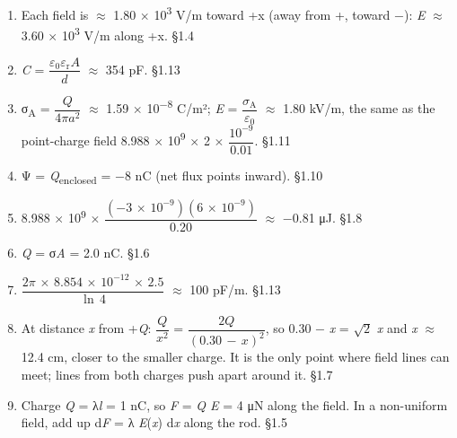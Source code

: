 \documentclass[11pt]{article}
\begin{document}
\begin{keepsection}
\begin{enumerate}
\item Each field is \ensuremath{\approx} 1.80 \ensuremath{\times} 10\textsuperscript{3} V/m toward +x (away from +, toward \ensuremath{-}): \textit{E} \ensuremath{\approx} 3.60 \ensuremath{\times} 10\textsuperscript{3} V/m along +x. \hfill{\small\color{FAUblue}§1.4}
\item \textit{C} = {\small\ensuremath{\dfrac{ε_{0}ε_{\mathrm{r}}{A}}{{d}}}} \ensuremath{\approx} 354 pF. \hfill{\small\color{FAUblue}§1.13}
\item σ\textsubscript{A} = {\small\ensuremath{\dfrac{{Q}}{4π{a}^{2}}}} \ensuremath{\approx} 1.59 \ensuremath{\times} 10\textsuperscript{\ensuremath{-}8} C/m²; \textit{E} = {\small\ensuremath{\dfrac{σ_{\mathrm{A}}}{ε_{0}}}} \ensuremath{\approx} 1.80 kV/m, the same as the point-charge field 8.988 \ensuremath{\times} 10\textsuperscript{9} \ensuremath{\times} 2 \ensuremath{\times} {\small\ensuremath{\dfrac{10^{-9}}{0.01}}}. \hfill{\small\color{FAUblue}§1.11}
\item Ψ = \textit{Q}\textsubscript{enclosed} = \ensuremath{-}8 nC (net flux points inward). \hfill{\small\color{FAUblue}§1.10}
\item 8.988 \ensuremath{\times} 10\textsuperscript{9} \ensuremath{\times} {\small\ensuremath{\dfrac{(-3\, \times \, 10^{-9})(6\, \times \, 10^{-9})}{0.20}}} \ensuremath{\approx} \ensuremath{-}0.81 μJ. \hfill{\small\color{FAUblue}§1.8}
\item \textit{Q} = σ\textit{A} = 2.0 nC. \hfill{\small\color{FAUblue}§1.6}
\item {\small\ensuremath{\dfrac{2π\, \times \, 8.854\, \times \, 10^{-12}\, \times \, 2.5}{\ln \, 4}}} \ensuremath{\approx} 100 pF/m. \hfill{\small\color{FAUblue}§1.13}
\item At distance \textit{x} from +\textit{Q}: {\small\ensuremath{\dfrac{{Q}}{{x}^{2}}}} = {\small\ensuremath{\dfrac{2{Q}}{(0.30\, -\, {x})^{2}}}}, so 0.30 \ensuremath{-} \textit{x} = \ensuremath{\sqrt{2}} \textit{x} and \textit{x} \ensuremath{\approx} 12.4 cm, closer to the smaller charge. It is the only point where field lines can meet; lines from both charges push apart around it. \hfill{\small\color{FAUblue}§1.7}
\item Charge \textit{Q} = λ\textit{l} = 1 nC, so \textit{F} = \textit{Q E} = 4 μN along the field. In a non-uniform field, add up d\textit{F} = λ \textit{E}(\textit{x}) d\textit{x} along the rod. \hfill{\small\color{FAUblue}§1.5}
\end{enumerate}

\end{keepsection}
\end{document}
